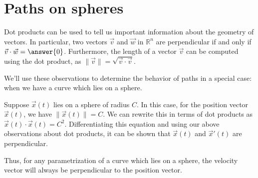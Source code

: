 \documentclass{ximera}
\begin{document}
\section*{Paths on spheres}

Dot products can be used to tell us important information about the geometry of vectors. In particular, two vectors $\vec{v}$ and $\vec{w}$ in $\mathbb{R}^n$ are perpendicular if and only if $\vec{v}\cdot\vec{w}=\answer{0}$. Furthermore, the length of a vector $\vec{v}$ can be computed using the dot product, as $\|\vec{v}\| =\sqrt{\vec{v}\cdot\vec{v}}$.

We'll use these observations to determine the behavior of paths in a special case: when we have a curve which lies on a sphere.

Suppose $\vec{x}(t)$ lies on a sphere of radius $C$. In this case, for the position vector $\vec{x}(t)$, we have $\|\vec{x}(t)\|=C$. We can rewrite this in terms of dot products as $\vec{x}(t)\cdot\vec{x}(t)=C^2$. Differentiating this equation and using our above observations about dot products, it can be shown that $\vec{x}(t)$ and $\vec{x}'(t)$ are perpendicular.

Thus, for any parametrization of a curve which lies on a sphere, the velocity vector will always be perpendicular to the position vector.
\end{document}
